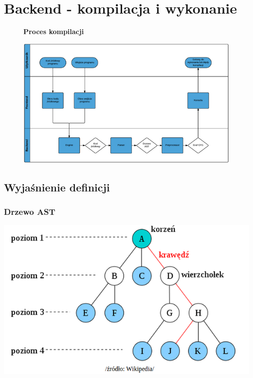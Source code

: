 \documentclass[a4paper,twoside,openright,11pt]{report}
\begin{document}
  \chapter {Backend - kompilacja i wykonanie}
  
\begin{figure}[H]
  \centering
  \textbf{Proces kompilacji}\par\medskip
  \includegraphics[width=\textwidth]{flow}
  \caption{}
\end{figure}

  
  \section {Wyjaśnienie definicji}

  \subsection {Drzewo AST}
\begin{center}
  \includegraphics[width=\textwidth]{ast}
\end{center}
  
\end{document}
